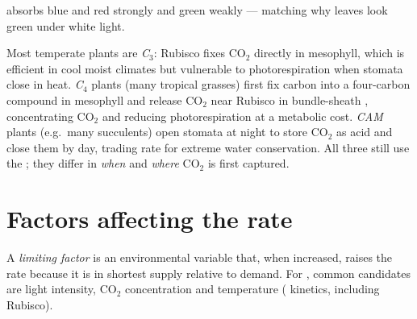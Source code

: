 \begin{omfigure}

{\small {} absorbs blue and red strongly and green weakly ---
matching why leaves look green under white light.}
\end{omfigure}

\begin{remark}
\label{rem:g10:photosynthesis:C3C4CAM}
Most temperate plants are \emph{C$_3$}: Rubisco fixes
$\mathrm{CO_2}$ directly in mesophyll, which is efficient in cool moist
climates but vulnerable to photorespiration when stomata close in heat.
\emph{C$_4$} plants (many tropical grasses) first fix carbon
into a four-carbon compound in mesophyll and release $\mathrm{CO_2}$ near
Rubisco in bundle-sheath , concentrating $\mathrm{CO_2}$ and reducing
photorespiration at a metabolic cost. \emph{CAM} plants
(e.g.\ many succulents) open stomata at night to store $\mathrm{CO_2}$ as acid
and close them by day, trading  rate for extreme water conservation.
All three still use the ; they differ in \emph{when} and
\emph{where} $\mathrm{CO_2}$ is first captured.
\end{remark}

\section{Factors affecting the rate}

\begin{definition}\label{def:g10:photosynthesis:limiting}
A \emph{limiting factor} is an environmental
variable that, when increased, raises the rate because it is in
shortest supply relative to demand. For , common candidates
are light intensity, $\mathrm{CO_2}$ concentration and temperature
( kinetics, including Rubisco).
\end{definition}

